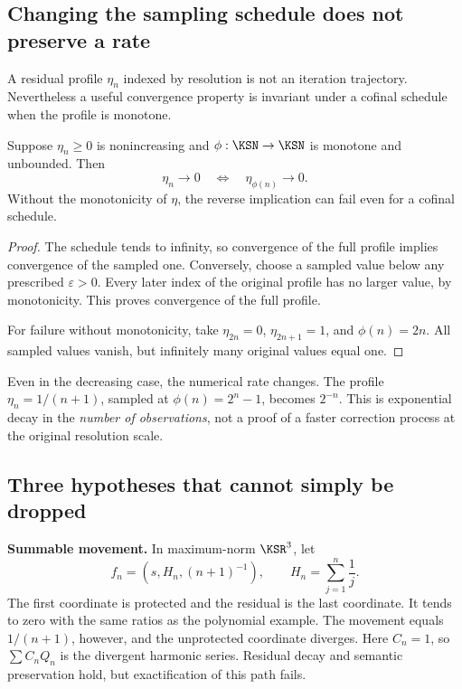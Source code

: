 \subsection{Changing the sampling schedule does not preserve a rate}
A residual profile \(\eta_n\) indexed by resolution is not an iteration trajectory. Nevertheless a useful convergence property is invariant under a cofinal schedule when the profile is monotone.

\begin{KSproposition}\label{KS:KS75}
Suppose \(\eta_n\ge0\) is nonincreasing and \(\phi:\KSN\to\KSN\) is monotone and unbounded. Then
\[
 \eta_n\to0\quad\Longleftrightarrow\quad\eta_{\phi(n)}\to0.
\]
Without the monotonicity of \(\eta\), the reverse implication can fail even for a cofinal schedule.
\end{KSproposition}
\begin{proof}
The schedule tends to infinity, so convergence of the full profile implies convergence of the sampled one. Conversely, choose a sampled value below any prescribed \(\varepsilon>0\). Every later index of the original profile has no larger value, by monotonicity. This proves convergence of the full profile.

For failure without monotonicity, take \(\eta_{2n}=0\), \(\eta_{2n+1}=1\), and \(\phi(n)=2n\). All sampled values vanish, but infinitely many original values equal one.
\end{proof}
Even in the decreasing case, the numerical rate changes. The profile \(\eta_n=1/(n+1)\), sampled at \(\phi(n)=2^n-1\), becomes \(2^{-n}\). This is exponential decay in the \emph{number of observations}, not a proof of a faster correction process at the original resolution scale.

\subsection{Three hypotheses that cannot simply be dropped}
\textbf{Summable movement.} In maximum-norm \(\KSR^3\), let
\[
 f_n=(s,H_n,(n+1)^{-1}),\qquad
 H_n=\sum_{j=1}^{n}\frac1j.
\]
The first coordinate is protected and the residual is the last coordinate. It tends to zero with the same ratios as the polynomial example. The movement equals \(1/(n+1)\), however, and the unprotected coordinate diverges. Here \(C_n=1\), so \(\sum C_nQ_n\) is the divergent harmonic series. Residual decay and semantic preservation hold, but exactification of this path fails.

